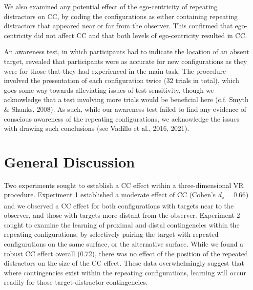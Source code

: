 \documentclass[
  english,
  man,floatsintext]{apa7}
\begin{document}
We also examined any potential effect of the ego-centricity of repeating distractors on CC, by coding the configurations as either containing repeating distractors that appeared near or far from the observer. This confirmed that ego-centricity did not affect CC and that both levels of ego-centricity resulted in CC.

An awareness test, in which participants had to indicate the location of an absent target, revealed that participants were as accurate for new configurations as they were for those that they had experienced in the main task. The procedure involved the presentation of each configuration twice (32 trials in total), which goes some way towards alleviating issues of test sensitivity, though we acknowledge that a test involving more trials would be beneficial here (c.f. Smyth \& Shanks, 2008). As such, while our awareness test failed to find any evidence of conscious awareness of the repeating configurations, we acknowledge the issues with drawing such conclusions (see Vadillo et al., 2016, 2021).

\hypertarget{general-discussion}{%
\section{General Discussion}\label{general-discussion}}

Two experiments sought to establish a CC effect within a three-dimensional VR procedure. Experiment 1 established a moderate effect of CC (Cohen's \emph{d\textsubscript{z}} = 0.66) and we observed a CC effect for both configurations with targets near to the observer, and those with targets more distant from the observer. Experiment 2 sought to examine the learning of proximal and distal contingencies within the repeating configurations, by selectively pairing the target with repeated configurations on the same surface, or the alternative surface. While we found a robust CC effect overall (0.72), there was no effect of the position of the repeated distractors on the size of the CC effect. These data overwhelmingly suggest that where contingencies exist within the repeating configurations, learning will occur readily for those target-distractor contingencies.
\end{document}
